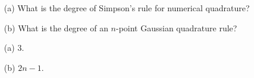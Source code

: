 \begin{pro}
  \begin{itemize}
  \item[(a)]
    What is the degree of Simpson's rule for numerical quadrature?

  \item[(b)]
    What is the degree of an $n$-point Gaussian quadrature rule?
  \end{itemize}
\end{pro}

\begin{sol}
  \begin{itemize}
  \item[(a)]
    $3$.

  \item[(b)]
    $2n-1$.
  \end{itemize}
\end{sol}
